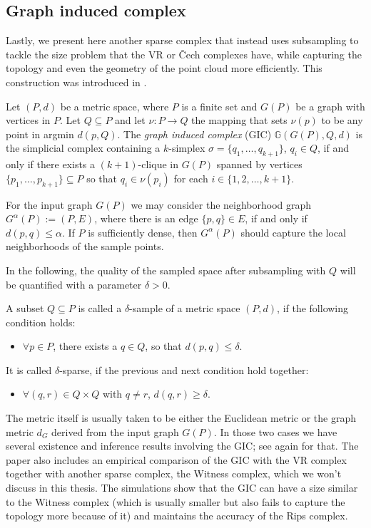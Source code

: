 \subsection{Graph induced complex}
Lastly, we present here another sparse complex that instead uses subsampling to tackle the size problem that the VR or Čech complexes have, while capturing the topology and even the geometry of the point cloud more efficiently. This construction was introduced in \cite{dey2013graphinducedcomplexpoint}.

\begin{definition}
  Let $(P,d)$ be a metric space, where $P$ is a finite set and $G(P)$ be a graph with vertices in $P$. Let $Q \subseteq P$ and let $\nu : P \to Q$ the mapping that sets $\nu(p)$ to be any point in argmin $d(p,Q)$. The \textit{graph induced complex} (GIC) $\mathbb{G}(G(P),Q,d)$ is the simplicial complex containing a $k$-simplex $\sigma=\{q_{1}, \ldots, q_{k+1}\}$, $q_{i} \in Q$, if and only if there exists a $(k+1)$-clique in $G(P)$ spanned by vertices $\{p_{1}, \ldots, p_{k+1}\} \subseteq P$ so that $q_{i} \in \nu(p_{i})$ for each $i \in \{1,2, \ldots, k+1\}$.
\end{definition}

For the input graph $G(P)$ we may consider the neighborhood graph $G^{\alpha}(P) := (P,E)$, where there is an edge $\{p,q\} \in E$, if and only if $d(p,q) \leq \alpha$. If $P$ is sufficiently dense, then $G^{\alpha}(P)$ should capture the local neighborhoods of the sample points.

In the following, the quality of the sampled space after subsampling with $Q$ will be quantified with a parameter $\delta > 0$.

\begin{definition}
  A subset $Q \subseteq P$ is called a $\delta$-sample of a metric space $(P,d)$, if the following condition holds:
  \begin{itemize}
  \item $\forall p \in P$, there exists a $q \in Q$, so that $d(p,q) \leq \delta$.
  \end{itemize}
  It is called $\delta$-sparse, if the previous and next condition hold together:
  \begin{itemize}
  \item $\forall (q,r) \in Q \times Q$ with $q \neq r$, $d(q,r) \geq \delta$.
  \end{itemize}
\end{definition}
The metric itself is usually taken to be either the Euclidean metric or the graph metric $d_{G}$ derived from the input graph $G(P)$. In those two cases we have several existence and inference results involving the GIC; see \cite{dey2013graphinducedcomplexpoint} again for that. The paper also includes an empirical comparison of the GIC with the VR complex together with another sparse complex, the Witness complex, which we won't discuss in this thesis. The simulations show that the GIC can have a size similar to the Witness complex (which is usually smaller but also fails to capture the topology more because of it) and maintains the accuracy of the Rips complex.


